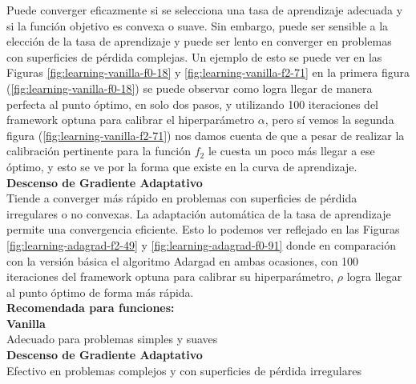 Puede converger eficazmente si se selecciona una tasa de aprendizaje adecuada y si la función objetivo es convexa o suave. Sin embargo, puede ser sensible a la elección de la tasa de aprendizaje y puede ser lento en converger en problemas con superficies de pérdida complejas. Un ejemplo de esto se puede ver en las Figuras \ref{fig:learning-vanilla-f0-18} y \ref{fig:learning-vanilla-f2-71} en la primera figura (\ref{fig:learning-vanilla-f0-18}) se puede observar como logra llegar de manera perfecta al punto óptimo, en solo dos pasos, y utilizando 100 iteraciones del framework optuna para calibrar el hiperparámetro $\alpha$, pero sí vemos la segunda figura (\ref{fig:learning-vanilla-f2-71}) nos damos cuenta de que a pesar de realizar la calibración pertinente para la función $f_2$ le cuesta un poco más llegar a ese óptimo, y esto se ve por la forma que existe en la curva de aprendizaje. 
\\
\textbf{Descenso de Gradiente Adaptativo}\\
Tiende a converger más rápido en problemas con superficies de pérdida irregulares o no convexas. La adaptación automática de la tasa de aprendizaje permite una convergencia eficiente. Esto lo podemos ver reflejado en las Figuras \ref{fig:learning-adagrad-f2-49} y \ref{fig:learning-adagrad-f0-91} donde en comparación con la versión básica el algoritmo Adargad en ambas ocasiones, con 100 iteraciones del framework optuna para calibrar su hiperparámetro, $\rho$ logra llegar al punto óptimo de forma más rápida. 
\\
\textbf{Recomendada para funciones:}\\
\textbf{Vanilla}\\
Adecuado para problemas simples y suaves
\\
\textbf{Descenso de Gradiente Adaptativo}\\
Efectivo en problemas complejos y con superficies de pérdida irregulares